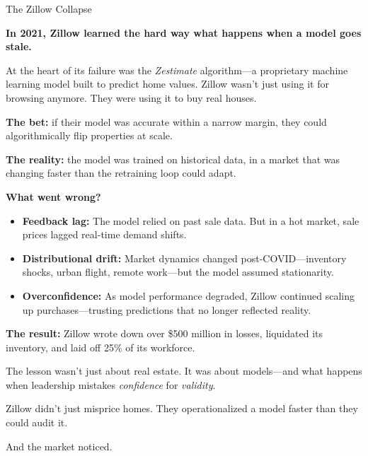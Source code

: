 \medskip

\begin{HistoricalSidebar}{The Zillow Collapse}

  \textbf{In 2021, Zillow learned the hard way what happens when a model goes stale.}

  \medskip
  
  At the heart of its failure was the \textit{Zestimate} algorithm—a proprietary machine learning model built to 
  predict home values.  
  Zillow wasn't just using it for browsing anymore. They were using it to buy real houses.
  
  \medskip
  
  \textbf{The bet:} if their model was accurate within a narrow margin, they could algorithmically flip properties at scale.  

  \medskip

  \textbf{The reality:} the model was trained on historical data, in a market that was changing faster than the 
  retraining loop could adapt.
  
  \medskip
  
  \textbf{What went wrong?}

  \medskip
  
  \begin{itemize}
    \item \textbf{Feedback lag:} The model relied on past sale data. But in a hot market, sale prices lagged real-time 
    demand shifts.
    \item \textbf{Distributional drift:} Market dynamics changed post-COVID—inventory shocks, urban flight, remote 
    work—but the model assumed stationarity.
    \item \textbf{Overconfidence:} As model performance degraded, Zillow continued scaling up purchases—trusting 
    predictions that no longer reflected reality.
  \end{itemize}

  \medskip
  
  \textbf{The result:}  Zillow wrote down over \$500 million in losses, liquidated its inventory, and laid off 25\% of 
  its workforce.
  
  \medskip
  
  The lesson wasn’t just about real estate.  
  It was about models—and what happens when leadership mistakes \textit{confidence} for \textit{validity}.
  
  Zillow didn’t just misprice homes.  
  They operationalized a model faster than they could audit it.
  
  And the market noticed.
  
\end{HistoricalSidebar}

